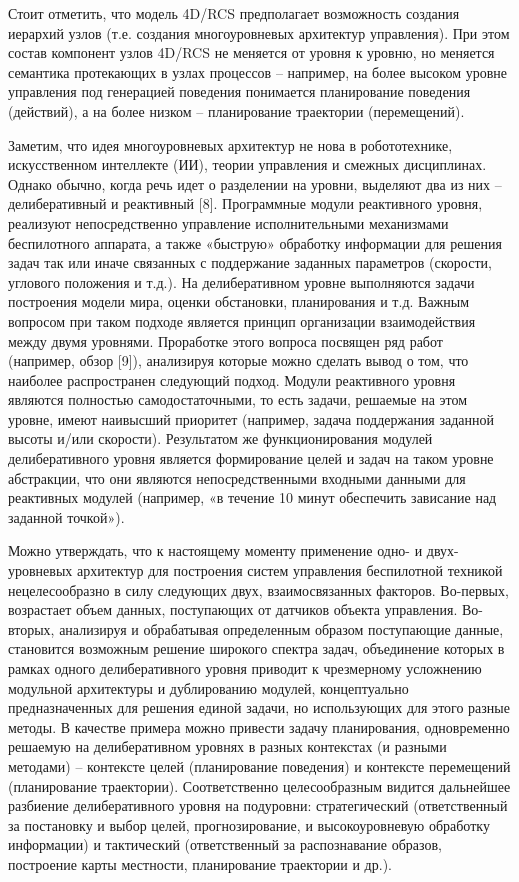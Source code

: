 \documentclass{svjour3}                     %
\begin{document}
Стоит отметить, что модель 4D/RCS предполагает возможность создания иерархий узлов (т.е. создания многоуровневых архитектур управления). При этом состав компонент узлов 4D/RCS не меняется от уровня к уровню, но меняется семантика протекающих в узлах процессов – например, на более высоком уровне управления под генерацией поведения понимается планирование поведения (действий), а на более низком – планирование траектории (перемещений).

Заметим, что идея многоуровневых архитектур не нова в робототехнике, искусственном интеллекте (ИИ), теории управления и смежных дисциплинах. Однако обычно, когда речь идет о разделении на уровни, выделяют два из них – делиберативный и реактивный [8]. Программные модули реактивного уровня, реализуют непосредственно управление исполнительными механизмами беспилотного аппарата, а также «быструю» обработку информации для решения задач так или иначе связанных с поддержание заданных параметров (скорости, углового положения и т.д.). На делиберативном уровне выполняются задачи построения модели мира, оценки обстановки, планирования и т.д. Важным вопросом при таком подходе является принцип организации взаимодействия между двумя уровнями. Проработке этого вопроса посвящен ряд работ (например, обзор [9]), анализируя которые можно сделать вывод о том, что наиболее распространен следующий подход. Модули реактивного уровня являются полностью самодостаточными, то есть задачи, решаемые на этом уровне, имеют наивысший приоритет (например, задача поддержания заданной высоты и/или скорости). Результатом же функционирования модулей делиберативного уровня является формирование целей и задач на таком уровне абстракции, что они являются непосредственными входными данными для  реактивных модулей (например, «в течение 10 минут обеспечить зависание над заданной точкой»).

Можно утверждать, что к настоящему моменту применение одно- и двух-уровневых архитектур для построения систем управления беспилотной техникой нецелесообразно в силу следующих двух, взаимосвязанных факторов. Во-первых, возрастает объем данных, поступающих от датчиков объекта управления. Во-вторых, анализируя и обрабатывая определенным образом поступающие данные, становится возможным решение широкого спектра задач, объединение которых в рамках одного делиберативного уровня приводит к чрезмерному усложнению модульной архитектуры и дублированию модулей, концептуально предназначенных для решения единой задачи, но использующих для этого разные методы. В качестве примера можно привести задачу планирования, одновременно решаемую на делиберативном уровнях в разных контекстах (и разными методами) – контексте целей (планирование поведения) и контексте перемещений (планирование траектории). Соответственно целесообразным видится дальнейшее разбиение делиберативного уровня на подуровни: стратегический (ответственный за постановку и выбор целей, прогнозирование, и высокоуровневую обработку информации) и тактический (ответственный за распознавание образов, построение карты местности, планирование траектории и др.).
\end{document}
